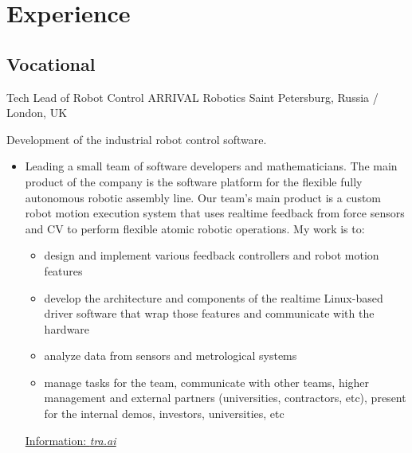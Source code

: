 \documentclass[11pt,a4paper]{moderncv}
\begin{document}
\newpage


\section{Experience}
\subsection{Vocational}
{Tech Lead of Robot Control}
{\newline ARRIVAL Robotics}
{\newline Saint Petersburg, Russia / London, UK}
{}{Development of the industrial robot control software.\newline{}
\begin{itemize}
\item Leading a small team of software developers and mathematicians. The main product of the
      company is the software platform for the flexible fully autonomous robotic assembly line. Our team's main product is a custom robot motion execution system that uses realtime feedback from force sensors and CV to perform flexible atomic robotic operations. My work is to:
      \begin{itemize}
        \item design and implement various feedback controllers and robot motion features
        \item develop the architecture and components of the realtime Linux-based driver software that wrap those features and communicate with the hardware
        \item analyze data from sensors and metrological systems
        \item manage tasks for the team, communicate with other teams, higher management and external partners (universities, contractors, etc), present for the internal demos, investors, universities, etc
      \end{itemize}
      \href{https://www.tra.ai}
      {Information: \underline{\emph{\textcolor[rgb]{0.00,0.00,0.50}{tra.ai}}}}
\end{itemize}}

\vspace{20 pt}
\end{document}
